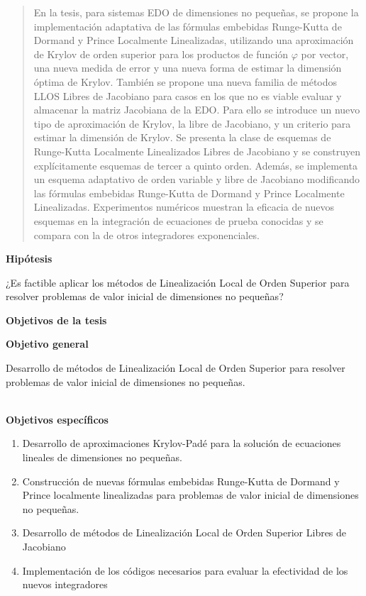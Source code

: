 \begin{abstract}
	En la tesis, para sistemas EDO de dimensiones no pequeñas, se propone la implementación adaptativa de las fórmulas embebidas Runge-Kutta de Dormand y Prince Localmente Linealizadas, utilizando una aproximación de Krylov de orden superior para los productos de función $\varphi$ por vector, una nueva medida de error y una nueva forma de estimar la dimensión óptima de Krylov. También se propone una nueva familia de métodos LLOS Libres de Jacobiano para casos en los que no es viable evaluar y almacenar la matriz Jacobiana de la EDO. Para ello se introduce un nuevo tipo de aproximación de Krylov, la libre de Jacobiano, y un criterio para estimar la dimensión de Krylov. Se presenta la clase de esquemas de Runge-Kutta Localmente Linealizados Libres de Jacobiano y se construyen explícitamente esquemas de tercer a quinto orden. Además, se implementa un esquema adaptativo de orden variable y libre de Jacobiano modificando las fórmulas embebidas Runge-Kutta de Dormand y Prince Localmente Linealizadas. Experimentos numéricos muestran la eficacia de nuevos esquemas en la integración de ecuaciones de prueba conocidas y se compara con la de otros integradores exponenciales.
\end{abstract}

\newpage

\begin{center}
	{\large \textbf{Hipótesis}}
\end{center}
¿Es factible aplicar los métodos de Linealización Local de Orden Superior para resolver problemas de valor inicial de dimensiones no pequeñas?

\qquad

\begin{center}
	{\large \textbf{Objetivos de la tesis}}
\end{center}
\textbf{Objetivo general}

Desarrollo de métodos de Linealización Local de Orden Superior para resolver problemas de valor inicial de dimensiones no pequeñas.

\qquad\\
\textbf{Objetivos específicos}

\begin{enumerate}
	\item Desarrollo de aproximaciones Krylov-Padé para la solución de ecuaciones lineales de dimensiones no pequeñas.
	\item Construcción de nuevas fórmulas embebidas Runge-Kutta de Dormand y Prince localmente linealizadas para problemas de valor inicial de dimensiones no pequeñas.
	\item Desarrollo de métodos de Linealización Local de Orden Superior Libres de Jacobiano
	\item Implementación de los códigos necesarios para evaluar la efectividad de los nuevos integradores
\end{enumerate}

